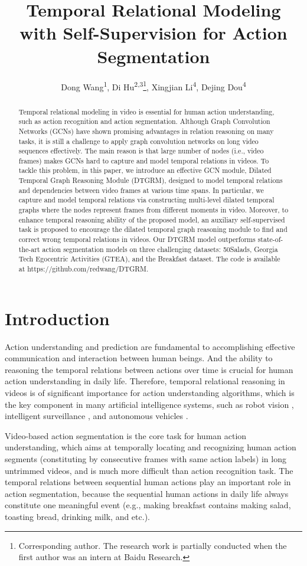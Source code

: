 \documentclass[letterpaper]{article} \usepackage{aaai21}  \usepackage{times}  \usepackage{helvet} \usepackage{courier}  \usepackage[hyphens]{url}  \usepackage{graphicx} \usepackage{mathtools}
\title{Temporal Relational Modeling with Self-Supervision for Action Segmentation}
\author{
    Dong Wang\textsuperscript{\rm 1},
    Di Hu\textsuperscript{\rm 2,3}\thanks{Corresponding author. The research work is partially conducted when the first author was an intern at Baidu Research.},
    Xingjian Li\textsuperscript{\rm 4},
    Dejing Dou\textsuperscript{\rm 4}
    \\
}
\begin{document}
\maketitle

\begin{abstract}
Temporal relational modeling in video is essential for human action understanding, such as action recognition and action segmentation. Although Graph Convolution Networks (GCNs) have shown promising advantages in relation reasoning on many tasks, it is still a challenge to apply graph convolution networks on long video sequences effectively. The main reason is that large number of nodes (i.e., video frames) makes GCNs hard to capture and model temporal relations in videos. To tackle this problem, in this paper, we introduce an effective GCN module, Dilated Temporal Graph Reasoning Module (DTGRM), designed to model temporal relations and dependencies between video frames at various time spans. In particular, we capture and model temporal relations via constructing multi-level dilated temporal graphs where the nodes represent frames from different moments in video. Moreover, to enhance temporal reasoning ability of the proposed model, an auxiliary self-supervised task is proposed to encourage the dilated temporal graph reasoning module to find and correct wrong temporal relations in videos. Our DTGRM model outperforms state-of-the-art action segmentation models on three challenging datasets: 50Salads, Georgia Tech Egocentric Activities (GTEA), and the Breakfast dataset. The code is available at https://github.com/redwang/DTGRM.
\end{abstract}

\section{Introduction}
Action understanding and prediction are fundamental to accomplishing effective communication and interaction between human beings. And the ability to reasoning the temporal relations between actions over time is crucial for human action understanding in daily life. Therefore, temporal relational reasoning in videos is of significant importance for action understanding algorithms, which is the key component in many artificial intelligence systems, such as robot vision \cite{kruger2007meaning,koppula2015anticipating}, intelligent surveillance \cite{danafar2007action}, and autonomous vehicles \cite{rasouli2019autonomous,sadigh2016planning}.

Video-based action segmentation \cite{fathi2011understanding,fathi2013modeling,kuehne2016end,lea2016segmental,lea2017temporal} is the core task for human action understanding, which aims at temporally locating and recognizing human action segments (constituting by consecutive frames with same action labels) in long untrimmed videos, and is much more difficult than action recognition task. The temporal relations between sequential human actions play an important role in action segmentation, because the sequential human actions in daily life always constitute one meaningful event (e.g., making breakfast contains making salad, toasting bread, drinking milk, and etc.).
\end{document}
